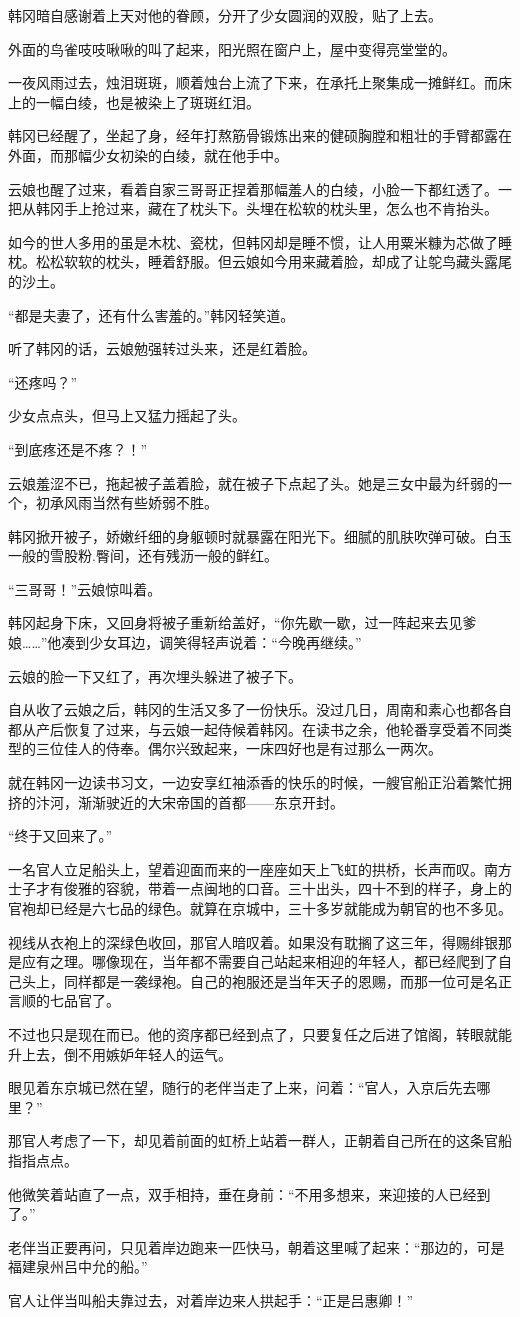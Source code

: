 韩冈暗自感谢着上天对他的眷顾，分开了少女圆润的双股，贴了上去。

外面的鸟雀吱吱啾啾的叫了起来，阳光照在窗户上，屋中变得亮堂堂的。

一夜风雨过去，烛泪斑斑，顺着烛台上流了下来，在承托上聚集成一摊鲜红。而床上的一幅白绫，也是被染上了斑斑红泪。

韩冈已经醒了，坐起了身，经年打熬筋骨锻炼出来的健硕胸膛和粗壮的手臂都露在外面，而那幅少女初染的白绫，就在他手中。

云娘也醒了过来，看着自家三哥哥正捏着那幅羞人的白绫，小脸一下都红透了。一把从韩冈手上抢过来，藏在了枕头下。头埋在松软的枕头里，怎么也不肯抬头。

如今的世人多用的虽是木枕、瓷枕，但韩冈却是睡不惯，让人用粟米糠为芯做了睡枕。松松软软的枕头，睡着舒服。但云娘如今用来藏着脸，却成了让鸵鸟藏头露尾的沙土。

“都是夫妻了，还有什么害羞的。”韩冈轻笑道。

听了韩冈的话，云娘勉强转过头来，还是红着脸。

“还疼吗？”

少女点点头，但马上又猛力摇起了头。

“到底疼还是不疼？！”

云娘羞涩不已，拖起被子盖着脸，就在被子下点起了头。她是三女中最为纤弱的一个，初承风雨当然有些娇弱不胜。

韩冈掀开被子，娇嫩纤细的身躯顿时就暴露在阳光下。细腻的肌肤吹弹可破。白玉一般的雪股粉.臀间，还有残沥一般的鲜红。

“三哥哥！”云娘惊叫着。

韩冈起身下床，又回身将被子重新给盖好，“你先歇一歇，过一阵起来去见爹娘……”他凑到少女耳边，调笑得轻声说着：“今晚再继续。”

云娘的脸一下又红了，再次埋头躲进了被子下。

自从收了云娘之后，韩冈的生活又多了一份快乐。没过几日，周南和素心也都各自都从产后恢复了过来，与云娘一起侍候着韩冈。在读书之余，他轮番享受着不同类型的三位佳人的侍奉。偶尔兴致起来，一床四好也是有过那么一两次。

就在韩冈一边读书习文，一边安享红袖添香的快乐的时候，一艘官船正沿着繁忙拥挤的汴河，渐渐驶近的大宋帝国的首都——东京开封。

“终于又回来了。”

一名官人立足船头上，望着迎面而来的一座座如天上飞虹的拱桥，长声而叹。南方士子才有俊雅的容貌，带着一点闽地的口音。三十出头，四十不到的样子，身上的官袍却已经是六七品的绿色。就算在京城中，三十多岁就能成为朝官的也不多见。

视线从衣袍上的深绿色收回，那官人暗叹着。如果没有耽搁了这三年，得赐绯银那是应有之理。哪像现在，当年都不需要自己站起来相迎的年轻人，都已经爬到了自己头上，同样都是一袭绿袍。自己的袍服还是当年天子的恩赐，而那一位可是名正言顺的七品官了。

不过也只是现在而已。他的资序都已经到点了，只要复任之后进了馆阁，转眼就能升上去，倒不用嫉妒年轻人的运气。

眼见着东京城已然在望，随行的老伴当走了上来，问着：“官人，入京后先去哪里？”

那官人考虑了一下，却见着前面的虹桥上站着一群人，正朝着自己所在的这条官船指指点点。

他微笑着站直了一点，双手相持，垂在身前：“不用多想来，来迎接的人已经到了。”

老伴当正要再问，只见着岸边跑来一匹快马，朝着这里喊了起来：“那边的，可是福建泉州吕中允的船。”

官人让伴当叫船夫靠过去，对着岸边来人拱起手：“正是吕惠卿！”


